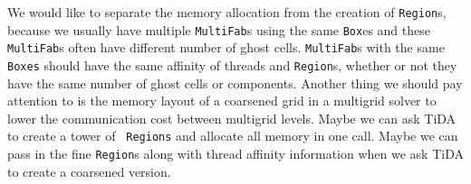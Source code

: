 We would like to separate the memory allocation from the creation of
{\tt Region}s, because we usually have multiple {\tt MultiFab}s using
the same {\tt Box}es and these {\tt MultiFab}s often have different
number of ghost cells.  {\tt MultiFab}s with the same {\tt Boxes}
should have the same affinity of threads and {\tt Region}s, whether or
not they have the same number of ghost cells or components.  Another
thing we should pay attention to is the memory layout of a coarsened
grid in a multigrid solver to lower the communication cost between
multigrid levels.  Maybe we can ask TiDA to create a tower of {\tt
  Regions} and allocate all memory in one call.  Maybe we can pass in
the fine {\tt Region}s along with thread affinity information when we
ask TiDA to create a coarsened version.

